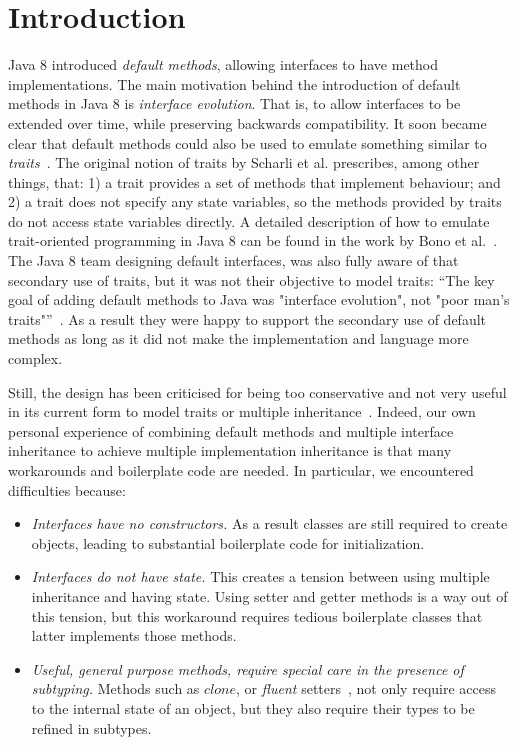 \section{Introduction}\label{sec:intro}

Java 8 introduced \emph{default methods}, allowing interfaces to have
method implementations. The main motivation behind the introduction of
default methods in Java 8 is \emph{interface evolution}. That is, to
allow interfaces to be extended over time, while preserving backwards
compatibility. It soon became clear that default methods could also be
used to emulate something similar to \emph{traits}~\cite{}. The
original notion of traits by Scharli et al. prescribes, among other
things, that: 1) a trait provides a set of methods that implement
behaviour; and 2) a trait does not specify any state variables, so the
methods provided by traits do not access state variables directly.  A
detailed description of how to emulate trait-oriented programming in
Java 8 can be found in the work by Bono et al.~\cite{}.  The Java 8
team designing default interfaces, was also fully aware of that
secondary use of traits, but it was not their objective to model
traits: ``The key goal of adding default methods to Java was
"interface evolution", not "poor man's traits"''~\cite{mailing list}. As
a result they were happy to support the secondary use of default
methods as long as it did not make the implementation and language
more complex. 
 
Still, the design has been criticised for being too conservative and 
not very useful in its current form to model traits or multiple 
inheritance~\cite{}. 
Indeed, our own personal experience of combining default methods 
and multiple interface inheritance to achieve multiple implementation 
inheritance is that many workarounds and boilerplate code are needed. 
In particular, we encountered difficulties because:

\begin{itemize}

\item {\em Interfaces have no constructors.} As a result classes are 
still required to create objects, leading to substantial boilerplate 
code for initialization.

\item {\em Interfaces do not have state.} This creates a tension between 
 using multiple inheritance and having state. Using setter and
  getter methods is a way out of this tension, but this workaround
  requires tedious boilerplate classes that latter implements those
  methods.

\item {\em Useful, general purpose methods, require special care in
  the presence of subtyping.} Methods such as $clone$, or
  \emph{fluent} setters~\cite{}, not only require access to the
  internal state of an object, but they also require their types to be
  refined in subtypes.

\end{itemize}

